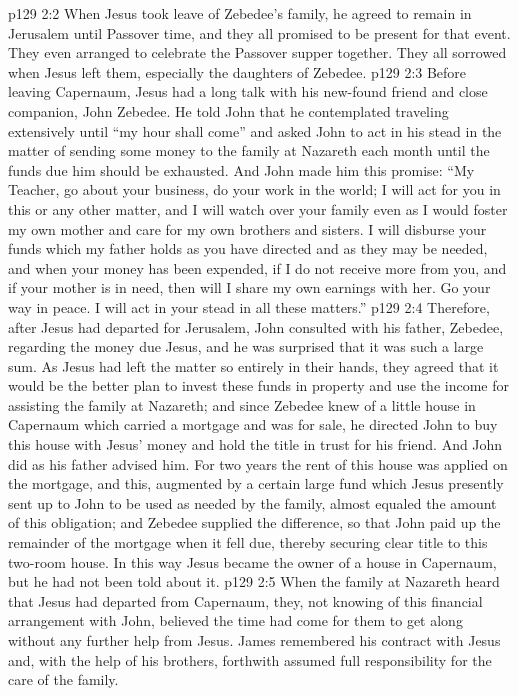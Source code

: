 \vs p129 2:2 When Jesus took leave of Zebedee’s family, he agreed to remain in Jerusalem until Passover time, and they all promised to be present for that event. They even arranged to celebrate the Passover supper together. They all sorrowed when Jesus left them, especially the daughters of Zebedee.
\vs p129 2:3 \pc Before leaving Capernaum, Jesus had a long talk with his new\hyp{}found friend and close companion, John Zebedee. He told John that he contemplated traveling extensively until \textcolor{ubdarkred}{“my hour shall come”} and asked John to act in his stead in the matter of sending some money to the family at Nazareth each month until the funds due him should be exhausted. And John made him this promise: “My Teacher, go about your business, do your work in the world; I will act for you in this or any other matter, and I will watch over your family even as I would foster my own mother and care for my own brothers and sisters. I will disburse your funds which my father holds as you have directed and as they may be needed, and when your money has been expended, if I do not receive more from you, and if your mother is in need, then will I share my own earnings with her. Go your way in peace. I will act in your stead in all these matters.”
\vs p129 2:4 Therefore, after Jesus had departed for Jerusalem, John consulted with his father, Zebedee, regarding the money due Jesus, and he was surprised that it was such a large sum. As Jesus had left the matter so entirely in their hands, they agreed that it would be the better plan to invest these funds in property and use the income for assisting the family at Nazareth; and since Zebedee knew of a little house in Capernaum which carried a mortgage and was for sale, he directed John to buy this house with Jesus’ money and hold the title in trust for his friend. And John did as his father advised him. For two years the rent of this house was applied on the mortgage, and this, augmented by a certain large fund which Jesus presently sent up to John to be used as needed by the family, almost equaled the amount of this obligation; and Zebedee supplied the difference, so that John paid up the remainder of the mortgage when it fell due, thereby securing clear title to this two\hyp{}room house. In this way Jesus became the owner of a house in Capernaum, but he had not been told about it.
\vs p129 2:5 \pc When the family at Nazareth heard that Jesus had departed from Capernaum, they, not knowing of this financial arrangement with John, believed the time had come for them to get along without any further help from Jesus. James remembered his contract with Jesus and, with the help of his brothers, forthwith assumed full responsibility for the care of the family.
